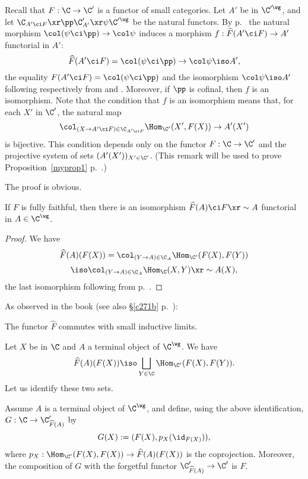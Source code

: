\documentclass[12pt]{article}
\theoremstyle{remark}
\theoremstyle{definition}
\begin{document}
\begin{rk}
Recall that $F:\C\to\C'$ is a functor of small categories. Let $A'$ be in $\C'^\wg$, and let $\C_{A'\ci F}\xr\pp\C'_{A'}\xr\psi\C'^\wg$ be the natural functors. By  p.~ the natural morphism $\col(\psi\ci\pp)\to\col\psi$ induces a morphism $f:\widehat F(A'\ci F)\to A'$ functorial in $A'$: 
$$
\widehat F(A'\ci F)=\col(\psi\ci\pp)\to\col\psi\iso A',
$$ 
the equality $F(A'\ci F)=\col(\psi\ci\pp)$ and the isomorphism $\col\psi\iso A'$ following respectively from  and . Moreover, if $\pp$ is cofinal, then $f$ is an isomorphism. Note that the condition that $f$ is an isomorphism means that, for each $X'$ in $\C'$, the natural map 
$$
\col_{(X\to A'\ci F)\in\C_{A'\ci F}}\Hom_{\C'}(X',F(X))\to A'(X')
$$ 
is bijective. This condition depends only on the functor $F:\C\to\C'$ and the projective system of sets $(A'(X'))_{X'\in\C'}$. (This remark will be used to prove Proposition~\ref{myprop1} p.~.)
\end{rk}

The proof is obvious.

\begin{rk}
If $F$ is fully faithful, then there is an isomorphism $\widehat F(A)\ci F\xr\sim A$ functorial in $A\in\C^\wg$.
\end{rk} 

\begin{proof}
We have 
$$
\widehat F(A)(F(X))=\col_{(Y\to A)\in\C_A}\Hom_{\C'}(F(X),F(Y))
$$
$$
\iso\col_{(Y\to A)\in\C_A}\Hom_\C(X,Y)\xr\sim A(X),
$$
the last isomorphism following from  p.~.
\end{proof}

As observed in the book (see also \S\ref{c271b} p.~):

\begin{rk}
The functor $\widehat F$ commutes with small inductive limits.
\end{rk} 

Let $X$ be in $\C$ and $A$ a terminal object of $\C^\wg$. We have 
$$
\widehat F(A)(F(X))\iso\bigsqcup_{Y\in\C}\Hom_{\C'}(F(X),F(Y)).
$$ 
Let us identify these two sets. 

\begin{rk}
Assume $A$ is a terminal object of $\C^\wg$, and define, using the above identification, $G:\C\to\C'_{\widehat F(A)}$ by 
$$
G(X):=(F(X),p_X(\id_{F(X)})),
$$ 
where $p_X:\Hom_{\C'}(F(X),F(X))\to\widehat F(A)(F(X))$ is the coprojection. Moreover, the composition of $G$ with the forgetful functor $\C'_{\widehat F(A)}\to\C'$ is $F$.
\end{rk} 
\end{document}
